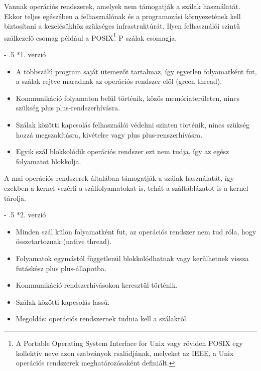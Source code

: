 \documentclass[tikz,12pt,margin=0px]{article}
\makeatletter
\renewcommand\paragraph{%
	\@startsection{paragraph}{4}{0mm}%
	{-\baselineskip}%
	{.5\baselineskip}%
	{\normalfont\normalsize\bfseries}}
\newcommand\lword[1]{\leavevmode\nobreak\hskip0pt plus\linewidth\penalty50\hskip0pt plus-\linewidth\nobreak #1}
\makeatother
\begin{document}
    \noindent Vannak operációs rendszerek, amelyek nem támogatják a szálak használatát. Ekkor teljes egészében a felhasználónak és a programozási környezetének kell biztosítani a kezelésükhöz szükséges infrastruktúrát. Ilyen felhasználói szintű szálkezelő csomag például a POSIX\footnote{A Portable Operating System Interface for Unix vagy röviden POSIX egy kollektív neve azon szabványok családjának, melyeket az IEEE, a Unix operációs rendszerek meghatározásaként definiált.} P szálak csomagja.

    \paragraph*{1. verzió}
    \begin{itemize}[topsep=8pt,itemsep=4pt,partopsep=4pt, parsep=4pt]
        \item A többszálú program saját ütemezőt tartalmaz, így egyetlen folyamatként fut, a szálak rejtve maradnak az operációs rendszer elől (green thread).
        \item Kommunikáció folyamaton belül történik, közös memóriaterületen, nincs szükség \lword{rendszerhívásra}.
        \item Szálak közötti kapcsolás felhasználói védelmi szinten történik, nincs szükség hozzá megszakításra, kivételre vagy \lword{renszerhívásra}.
        \item Egyik szál blokkolódik operációs rendszer ezt nem tudja, így az egész folyamatot blokkolja.
    \end{itemize}

    \noindent A mai operációs rendszerek általában támogatják a szálak használatát, így ezekben a kernel vezérli a szálfolyamatokat is, tehát a száltáblázatot is a kernel tárolja.

    \paragraph*{2. verzió}
    \begin{itemize}[topsep=8pt,itemsep=4pt,partopsep=4pt, parsep=4pt]
        \item  Minden szál külön folyamatként fut, az operációs rendszer nem tud róla, hogy összetartoznak (native thread).
        \item  Folyamatok egymástól függetlenül blokkolódhatnak vagy kerülhetnek vissza futáskész \lword{állapotba}.
        \item  Kommunikáció rendszerhívásokon keresztül történik.
        \item  Szálak közötti kapcsolás lassú.
        \item  Megoldás: operációs rendszernek tudnia kell a szálakról.
    \end{itemize}
\end{document}

